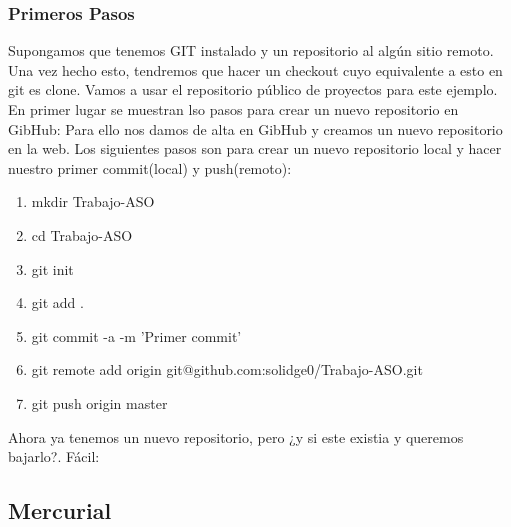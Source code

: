 \subsubsection{Primeros Pasos}
Supongamos que tenemos GIT instalado y un repositorio al algún sitio remoto. 
Una vez hecho esto, tendremos que hacer un checkout cuyo equivalente a esto en git es clone. Vamos a usar el repositorio público de proyectos 
para este ejemplo.\\
En primer lugar se muestran lso pasos para crear un nuevo repositorio en GibHub: Para ello nos damos de alta en GibHub y creamos un nuevo 
repositorio en la web. Los siguientes pasos son para crear un nuevo repositorio local y hacer nuestro primer commit(local) y push(remoto):
\begin{enumerate}
\item mkdir Trabajo-ASO
\item cd Trabajo-ASO
\item git init
\item git add .
\item git commit -a -m 'Primer commit'
\item git remote add origin git@github.com:solidge0/Trabajo-ASO.git
\item git push origin master
\end{enumerate}
Ahora ya tenemos un nuevo repositorio, pero ¿y si este existia y queremos bajarlo?. Fácil:\\


\subsection{Mercurial}